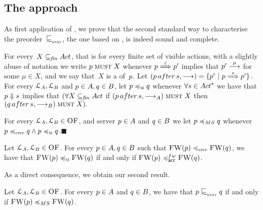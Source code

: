 \newcommand{\msleqtwo}{\preccurlyeq_{\textsc{m}}}

\subsection{The \MustSet approach}
As first application of , we prove that the
second standard way to characterise the preorder~$\testleqS$, \ie
the one based on \MustSets, is indeed sound and complete.

\renewcommand{\after}[3]{ (#1 \, \mathsf{after} \,  #2, #3) }

For every~$X \subseteq_{\mathit{fin}} \Act$, that is for every finite set of visible actions,
with a slightly abuse of notation we write $p \mathrel{\operatorname{\textsc{must}}} X$ whenever $p \mathrel{\overset{ \varepsilon } \Longrightarrow} p'$ implies that $p' \mathrel{\overset{ \mu }\longrightarrow}$ for some $\mu \in X$, and we say that~$X$ is a \MustSet of~$p$.
Let $\after{ \serverA }{ s }{ \st{} } = \setof{ \serverA' }{ \serverA \wt{s} \serverA' }$.
For every $\mathcal{L}_A, \mathcal{L}_B$ and $p \in A, q \in B$,
let $\serverA \msleqtwo \serverB$ whenever
$\forall \trace \in \Actfin$ we have that $p \mathrel{\Downarrow}{ s
}$ implies that $(\forall X \subseteq_{\mathit{fin}} \Act$ if
$\after{\serverA}{\trace}{ \st{}_\StatesA } \mathrel{\opMust} X$ then
$\after{\serverB}{\trace}{ \st{}_\StatesB } \mathrel{\opMust} X).$



\begin{definition}
  \label{def:denicola-char}
  For every $\mathcal{L}_A, \mathcal{L}_B \in \textsc{OF}$, and server $p
  \in A$ and $q \in B$ we let $\serverA \msleq \serverB$ whenever
  $\serverA \bhvleqone \serverB \wedge
  \serverA \msleqtwo \serverB$.\hfill$\blacksquare$
\end{definition}


\begin{lemma}
  \label{lem:acceptance-sets-and-must-sets-have-same-expressivity}
  Let $\mathcal{L}_A, \mathcal{L}_B \in \textsc{OF}$.
  For every $p \in A, q \in B $ such that $\liftFW{\serverA} \bhvleqone \liftFW{\serverB}$,
  we have that
  $\liftFW{\serverA} \msleqtwo \liftFW{\serverB}$ if and only if
  $\liftFW{\serverA} \asleqAfw \liftFW{\serverB}$.
\end{lemma}
\noindent
As a direct consequence, we obtain our second result.
\begin{theorem}
  \label{thm:testleqS-equals-mustsetleq}
    Let $\mathcal{L}_A, \mathcal{L}_B \in \textsc{OF}$.
  For every $p \in A$  and
  $q \in B $, we have that
  $\serverA \testleqS \serverB$ if and only if
  $\liftFW{\serverA} \msleq \liftFW{\serverB}$.
\end{theorem}


